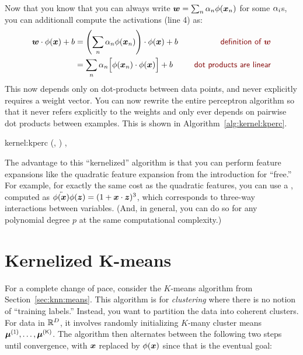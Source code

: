 Now that you know that you can always write ${\boldsymbol{w}} = \sum_n \alpha_n
\phi({\boldsymbol{x}}_n)$ for some $\alpha_i$s, you can additionall compute the
activations (line 4) as:
%
\begin{align}
\dotp{\vw}{\phi(\vx)}+b
&= \dotp{\left( \sum_n \al_n \phi(\vx_n) \right)}{\phi(\vx)} + b
\becauseof{definition of $\vw$} \\
&= \sum_n \al_n \Big[ \dotp{\phi(\vx_n)}{\phi(\vx)} \Big] + b
\becauseof{dot products are linear}
\end{align}
%
This now depends only on dot-products between data points, and never
explicitly requires a weight vector.  You can now rewrite the entire
perceptron algorithm so that it never refers explicitly to the weights
and only ever depends on pairwise dot products between examples.  This
is shown in Algorithm~\ref{alg:kernel:kperc}.

\newalgorithm%
  {kernel:kperc}%
  {(, )}
  {
\ENDIF
\ENDFOR
\ENDFOR
\RETURN \VAR{$\vec\al$}, 
}

The advantage to this ``kernelized'' algorithm is that you can perform
feature expansions like the quadratic feature expansion from the
introduction for ``free.''  For example, for exactly the same cost as
the quadratic features, you can use a ,
computed as $\ddot{\phi({\boldsymbol{x}})}{\phi({\boldsymbol{z}})} = (1 + {\boldsymbol{x}} \cdot {\boldsymbol{z}})^3$,
which corresponds to three-way interactions between variables.  (And,
in general, you can do so for any polynomial degree $p$ at the same
computational complexity.)

\section{Kernelized K-means}

For a complete change of pace, consider the $K$-means algorithm from
Section~\ref{sec:knn:means}.  This algorithm is for \emph{clustering}
where there is no notion of ``training labels.''  Instead, you want to
partition the data into coherent clusters.  For data in $\mathbb{R}^D$, it
involves randomly initializing $K$-many cluster means $\vec\mu\oth,
\dots, \vec\mu\Kth$.  The algorithm then alternates between the
following two steps until convergence, with ${\boldsymbol{x}}$ replaced by
$\phi({\boldsymbol{x}})$ since that is the eventual goal:


